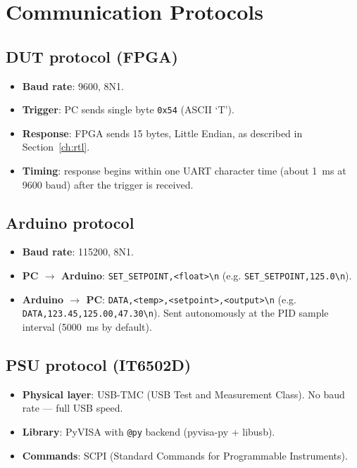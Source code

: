 \documentclass[12pt, a4paper]{report}
\begin{document}
\chapter{Communication Protocols}
\label{ch:protocol}

\section{DUT protocol (FPGA)}

\begin{itemize}
  \item \textbf{Baud rate}: 9600, 8N1.
  \item \textbf{Trigger}: PC sends single byte \texttt{0x54} (ASCII `T').
  \item \textbf{Response}: FPGA sends 15 bytes, Little Endian, as described in Section~\ref{ch:rtl}.
  \item \textbf{Timing}: response begins within one UART character time (about 1~ms at 9600 baud)
        after the trigger is received.
\end{itemize}

\section{Arduino protocol}

\begin{itemize}
  \item \textbf{Baud rate}: 115200, 8N1.
  \item \textbf{PC $\rightarrow$ Arduino}: \texttt{SET\_SETPOINT,<float>\textbackslash n}
        (e.g. \texttt{SET\_SETPOINT,125.0\textbackslash n}).
  \item \textbf{Arduino $\rightarrow$ PC}: \texttt{DATA,<temp>,<setpoint>,<output>\textbackslash n}
        (e.g. \texttt{DATA,123.45,125.00,47.30\textbackslash n}).
        Sent autonomously at the PID sample interval (5000~ms by default).
\end{itemize}

\section{PSU protocol (IT6502D)}

\begin{itemize}
  \item \textbf{Physical layer}: USB-TMC (USB Test and Measurement Class).
        No baud rate --- full USB speed.
  \item \textbf{Library}: PyVISA with \texttt{@py} backend (pyvisa-py + libusb).
  \item \textbf{Commands}: SCPI (Standard Commands for Programmable Instruments).
\end{itemize}
\end{document}
